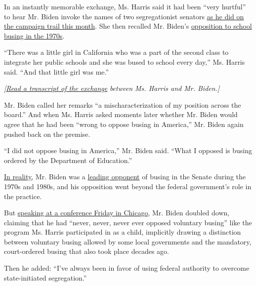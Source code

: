 In an instantly memorable exchange, Ms. Harris said it had been ``very
hurtful'' to hear Mr. Biden invoke the names of two segregationist
senators
\href{https://www.nytimes3xbfgragh.onion/2019/06/19/us/politics/biden-segregationists.html?module=inline}{as
he did on the campaign trail this month}. She then recalled Mr. Biden's
\href{https://www.nytimes3xbfgragh.onion/2019/06/27/us/politics/factcheck-democratic-debate.html?module=inline}{opposition
to school busing in the 1970s}.

``There was a little girl in California who was a part of the second
class to integrate her public schools and she was bused to school every
day,'' Ms. Harris said. ``And that little girl was me.''

\emph{{[}\href{https://www.nytimes3xbfgragh.onion/2019/06/27/us/politics/kamala-harris-joe-biden-busing.html?action=click\&module=RelatedCoverage\&pgtype=Article\&region=Footer}{Read
a transcript of the exchange}} \emph{between Ms. Harris and Mr.
Biden.{]}}

Mr. Biden called her remarks ``a mischaracterization of my position
across the board.'' And when Ms. Harris asked moments later whether Mr.
Biden would agree that he had been ``wrong to oppose busing in
America,'' Mr. Biden again pushed back on the premise.

``I did not oppose busing in America,'' Mr. Biden said. ``What I opposed
is busing ordered by the Department of Education.''

\href{https://www.nytimes3xbfgragh.onion/2019/06/27/us/politics/factcheck-democratic-debate.html}{In
reality,} Mr. Biden was a
\href{https://www.nytimes3xbfgragh.onion/2019/06/21/us/politics/joe-biden-james-eastland.html?module=inline}{leading
opponent} of busing in the Senate during the 1970s and 1980s, and his
opposition went beyond the federal government's role in the practice.

But
\href{https://www.nytimes3xbfgragh.onion/2019/06/28/us/politics/biden-harris-debate-democratic.html}{speaking
at a conference Friday in Chicago}, Mr. Biden doubled down, claiming
that he had ``never, never, never ever opposed voluntary busing'' like
the program Ms. Harris participated in as a child, implicitly drawing a
distinction between voluntary busing allowed by some local governments
and the mandatory, court-ordered busing that also took place decades
ago.

Then he added: ``I've always been in favor of using federal authority to
overcome state-initiated segregation.''

